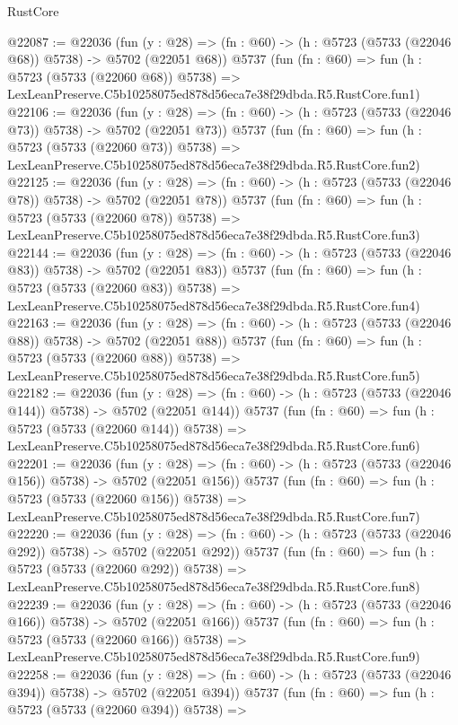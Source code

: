\begin{lexlean}{RustCore}
\begin{coremodule}
@22087 := @22036
    (fun (y : @28) => (fn : @60) -> (h : @5723 (@5733 (@22046 @68)) @5738) -> @5702 (@22051 @68))
    @5737
    (fun (fn : @60) =>
    fun (h : @5723 (@5733 (@22060 @68)) @5738) =>
    LexLeanPreserve.C5b10258075ed878d56eca7e38f29dbda.R5.RustCore.fun1)
@22106 := @22036
    (fun (y : @28) => (fn : @60) -> (h : @5723 (@5733 (@22046 @73)) @5738) -> @5702 (@22051 @73))
    @5737
    (fun (fn : @60) =>
    fun (h : @5723 (@5733 (@22060 @73)) @5738) =>
    LexLeanPreserve.C5b10258075ed878d56eca7e38f29dbda.R5.RustCore.fun2)
@22125 := @22036
    (fun (y : @28) => (fn : @60) -> (h : @5723 (@5733 (@22046 @78)) @5738) -> @5702 (@22051 @78))
    @5737
    (fun (fn : @60) =>
    fun (h : @5723 (@5733 (@22060 @78)) @5738) =>
    LexLeanPreserve.C5b10258075ed878d56eca7e38f29dbda.R5.RustCore.fun3)
@22144 := @22036
    (fun (y : @28) => (fn : @60) -> (h : @5723 (@5733 (@22046 @83)) @5738) -> @5702 (@22051 @83))
    @5737
    (fun (fn : @60) =>
    fun (h : @5723 (@5733 (@22060 @83)) @5738) =>
    LexLeanPreserve.C5b10258075ed878d56eca7e38f29dbda.R5.RustCore.fun4)
@22163 := @22036
    (fun (y : @28) => (fn : @60) -> (h : @5723 (@5733 (@22046 @88)) @5738) -> @5702 (@22051 @88))
    @5737
    (fun (fn : @60) =>
    fun (h : @5723 (@5733 (@22060 @88)) @5738) =>
    LexLeanPreserve.C5b10258075ed878d56eca7e38f29dbda.R5.RustCore.fun5)
@22182 := @22036
    (fun (y : @28) => (fn : @60) -> (h : @5723 (@5733 (@22046 @144)) @5738) -> @5702 (@22051 @144))
    @5737
    (fun (fn : @60) =>
    fun (h : @5723 (@5733 (@22060 @144)) @5738) =>
    LexLeanPreserve.C5b10258075ed878d56eca7e38f29dbda.R5.RustCore.fun6)
@22201 := @22036
    (fun (y : @28) => (fn : @60) -> (h : @5723 (@5733 (@22046 @156)) @5738) -> @5702 (@22051 @156))
    @5737
    (fun (fn : @60) =>
    fun (h : @5723 (@5733 (@22060 @156)) @5738) =>
    LexLeanPreserve.C5b10258075ed878d56eca7e38f29dbda.R5.RustCore.fun7)
@22220 := @22036
    (fun (y : @28) => (fn : @60) -> (h : @5723 (@5733 (@22046 @292)) @5738) -> @5702 (@22051 @292))
    @5737
    (fun (fn : @60) =>
    fun (h : @5723 (@5733 (@22060 @292)) @5738) =>
    LexLeanPreserve.C5b10258075ed878d56eca7e38f29dbda.R5.RustCore.fun8)
@22239 := @22036
    (fun (y : @28) => (fn : @60) -> (h : @5723 (@5733 (@22046 @166)) @5738) -> @5702 (@22051 @166))
    @5737
    (fun (fn : @60) =>
    fun (h : @5723 (@5733 (@22060 @166)) @5738) =>
    LexLeanPreserve.C5b10258075ed878d56eca7e38f29dbda.R5.RustCore.fun9)
@22258 := @22036
    (fun (y : @28) => (fn : @60) -> (h : @5723 (@5733 (@22046 @394)) @5738) -> @5702 (@22051 @394))
    @5737
    (fun (fn : @60) =>
    fun (h : @5723 (@5733 (@22060 @394)) @5738) =>

\end{coremodule}
\end{lexlean}
